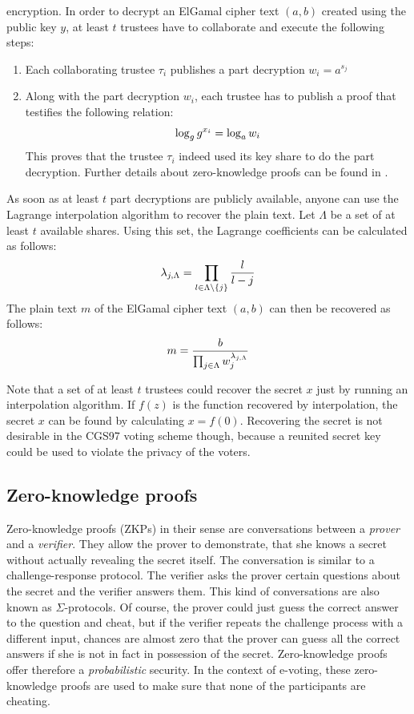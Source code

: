 \documentclass[numbers=noenddot, abstract=on, a4paper, headsepline,
footsepline, oneside, openright, draft=off, listof=leveldown]{scrreprt}
\begin{document}
encryption. In order to decrypt an ElGamal cipher text $(a, b)$ created using the
public key $y$, at least $t$ trustees have to collaborate and execute the following steps:
\begin{enumerate}
  \item Each collaborating trustee $\tau_i$ publishes a part decryption $w_i =
  a^{s_j}$
  \item Along with the part decryption $w_i$, each trustee has to publish a
  proof that testifies the following relation:
  \begin{equation}
	\log_g g^{x_i} = \log_a w_i \notag
  \end{equation}
  This proves that the trustee $\tau_i$ indeed used its key share to do the part
  decryption. Further details about zero-knowledge proofs can be found in
  .
\end{enumerate}
As soon as at least $t$ part decryptions are publicly available, anyone can use
the Lagrange interpolation algorithm to recover the plain text. Let $\Lambda$ be a set of
at least $t$ available shares. Using this set, the Lagrange coefficients can be
calculated as follows:
\begin{equation}
	\lambda_{j,\Lambda} = \prod_{l\in \Lambda \backslash \{j\}} \frac{l}{l-j} \notag
\end{equation}
The plain text $m$ of the ElGamal cipher text $(a, b)$ can then be recovered as
follows:
\begin{equation}
	m = \frac{b}{\prod_{j \in \Lambda} w_j^{\lambda_{j,\Lambda}}} \notag
\end{equation}

Note that a set of at least $t$ trustees could recover the secret $x$ just
by running an interpolation algorithm. If $f(z)$ is the function recovered by
interpolation, the secret $x$ can be found by calculating $x=f(0)$. Recovering
the secret is not desirable in the CGS97 voting scheme though, because a
reunited secret key could be used to violate the privacy of the voters.

\subsection{Zero-knowledge proofs}
\label{sec:zeroknowledgeproofs}
Zero-knowledge proofs (ZKPs) in their sense are conversations between a
\textit{prover} and a \textit{verifier}. They allow the prover to demonstrate,
that she knows a secret without actually revealing the secret itself. The
conversation is similar to a challenge-response protocol. The verifier asks the
prover certain questions about the secret and the verifier answers them. This
kind of conversations are also known as $\Sigma$-protocols. Of course, the
prover could just guess the correct answer to the question and cheat, but if the
verifier repeats the challenge process with a different input, chances are
almost zero that the prover can guess all the correct answers if she is not in
fact in possession of the secret. Zero-knowledge proofs offer therefore a
\textit{probabilistic} security. In the context of e-voting, these
zero-knowledge proofs are used to make sure that none of the participants are
cheating.
\end{document}
